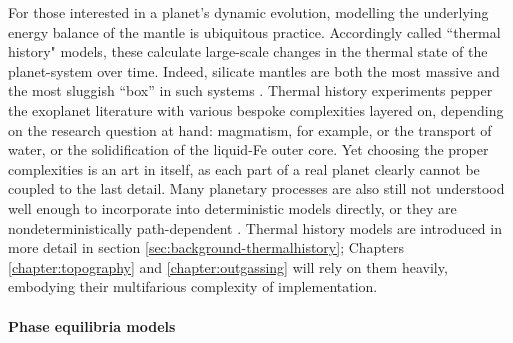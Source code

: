 For those interested in a planet's dynamic evolution, modelling the underlying energy balance of the mantle is ubiquitous practice. Accordingly called ``thermal history" models, these calculate large-scale changes in the thermal state of the planet-system over time. Indeed, silicate mantles are both the most massive and the most sluggish ``box'' in such systems \citep{bercovici_mantle_2011}. Thermal history experiments pepper the exoplanet literature with various bespoke complexities layered on, depending on the research question at hand: magmatism, for example, or the transport of water, or the solidification of the liquid-Fe outer core. Yet choosing the proper complexities is an art in itself, as each part of a real planet clearly cannot be coupled to the last detail. Many planetary processes are also still not understood well enough to incorporate into deterministic models directly, or they are nondeterministically path-dependent \citep[no model is expected to predict the tectonic mode of a mature exoplanet \textit{a priori}, e.g.;][]{lenardic_notion_2012, lenardic_solar_2016, weller_evolution_2018}. %
Thermal history models are introduced in more detail in section \ref{sec:background-thermalhistory}; Chapters \ref{chapter:topography} and \ref{chapter:outgassing} will rely on them heavily, embodying their multifarious complexity of implementation.%


\paragraph{Phase equilibria models}

